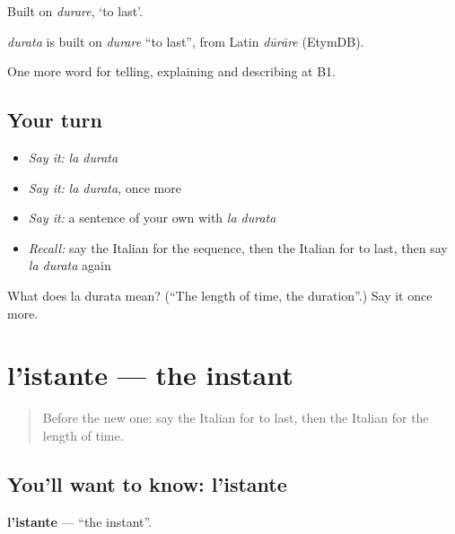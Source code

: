 Built on \emph{durare}, ‘to last’.

\begin{cousinweb}
\emph{durata} is built on \emph{durare} \textquotedblleft{}to last\textquotedblright{}, from Latin \emph{dūrāre} (EtymDB).
\end{cousinweb}

\begin{grammarlens}[title={What you've built}]
One more word for telling, explaining and describing at B1.
\end{grammarlens}

\subsection*{Your turn}
\begin{itemize}
\raggedright
  \item \emph{Say it:} \emph{la durata}
  \item \emph{Say it:} \emph{la durata}, once more
  \item \emph{Say it:} a sentence of your own with \emph{la durata}
  \item \emph{Recall:} say the Italian for the sequence, then the Italian for to last, then say \emph{la durata} again
\end{itemize}

\begin{tcolorbox}[breakable,colback=teal!4,colframe=teal!35!black,title={Before you move on}]
What does la durata mean? (\textquotedblleft{}The length of time, the duration\textquotedblright{}.) Say it once more.
\end{tcolorbox}
\section[l'istante]{l'istante — the instant}

\label{lesson:IT-C277-istante}



\begin{quote}
Before the new one: say the Italian for to last, then the Italian for the length of time.
\end{quote}

\subsection*{You'll want to know: l'istante}
\textbf{l'istante} — \textquotedblleft{}the instant\textquotedblright{}.

